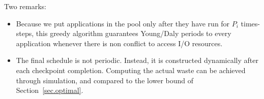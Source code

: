 \documentclass[conference]{IEEEtran}
\begin{document}
Two remarks:
\begin{itemize}
\item Because we put applications in the pool only after they have run for $P_{i}$ times-steps,
this greedy algorithm guarantees Young/Daly periods to every application
whenever there is non conflict to access I/O resources.
\item The final schedule is not periodic. Instead, it is constructed dynamically
after each checkpoint completion. Computing the actual waste can be achieved
through simulation, and compared to the lower bound of Section~\ref{sec.optimal}.
\end{itemize}
\end{document}
